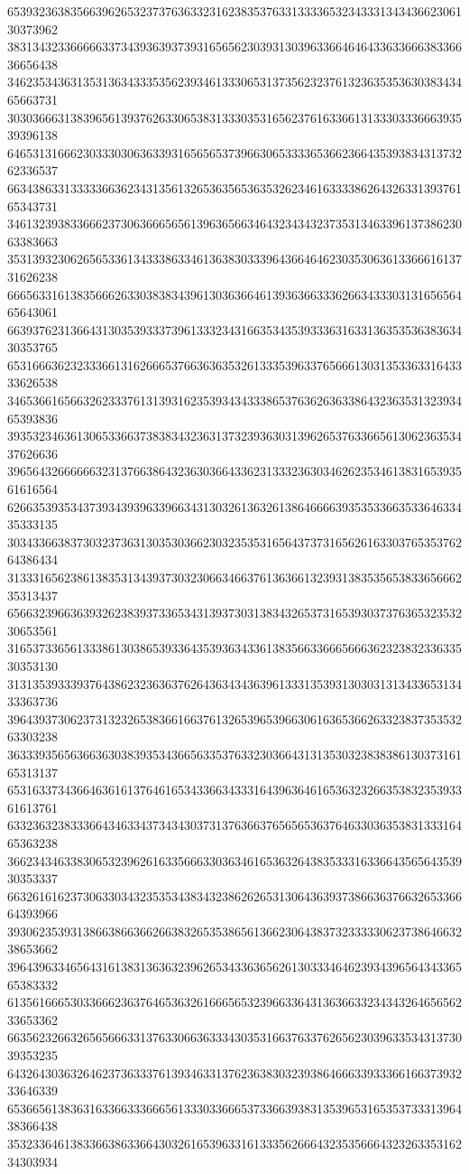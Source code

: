 65393236383566396265323737636332316238353763313333653234333134343662306130373962
38313432336666633734393639373931656562303931303963366464643363366638336636656438
34623534363135313634333535623934613330653137356232376132363535363038343465663731
30303666313839656139376263306538313330353165623761633661313330333666393539396138
64653131666230333030636339316565653739663065333365366236643539383431373262336537
66343863313333366362343135613265363565363532623461633338626432633139376165343731
34613239383366623730636665656139636566346432343432373531346339613738623063383663
35313932306265653361343338633461363830333964366464623035306361336661613731626238
66656331613835666263303838343961303636646139363663336266343330313165656465643061
66393762313664313035393337396133323431663534353933363163313635353638363430353765
65316663623233366131626665376636363532613335396337656661303135336331643333626538
34653661656632623337613139316235393434333865376362636338643236353132393465393836
39353234636130653366373838343236313732393630313962653763366561306236353437626636
39656432666666323137663864323630366433623133323630346262353461383165393561616564
62663539353437393439396339663431303261363261386466663935353366353364633435333135
30343366383730323736313035303662303235353165643737316562616330376535376264386434
31333165623861383531343937303230663466376136366132393138353565383365666235313437
65663239663639326238393733653431393730313834326537316539303737636532353230653561
31653733656133386130386539336435393634336138356633666566636232383233633530353130
31313539333937643862323636376264363434363961333135393130303131343365313433363736
39643937306237313232653836616637613265396539663061636536626332383735353263303238
36333935656366363038393534366563353763323036643131353032383838613037316165313137
65316337343664636161376461653433663433316439636461653632326635383235393361613761
63323632383336643463343734343037313763663765656536376463303635383133316465363238
36623434633830653239626163356663303634616536326438353331633664356564353930353337
66326161623730633034323535343834323862626531306436393738663637663265336664393966
39306235393138663866366266383265353865613662306438373233333062373864663238653662
39643963346564316138313636323962653433636562613033346462393439656434336565383332
61356166653033666236376465363261666565323966336431363663323434326465656233653362
66356232663265656663313763306636333430353166376337626562303963353431373039353235
64326430363264623736333761393463313762363830323938646663393336616637393233646339
65366561383631633663336665613330336665373366393831353965316535373331396438366438
35323364613833663863366430326165396331613335626664323535666432326335316234303934
